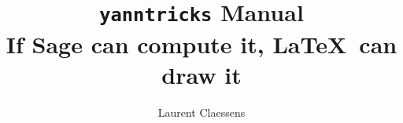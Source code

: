 \documentclass[a4paper]{article}
\begin{document}
\title{\texttt{yanntricks} Manual\\If Sage can compute it, \LaTeX\ can draw it}
\author{Laurent Claessens}
\maketitle

\tableofcontents



\end{document}
